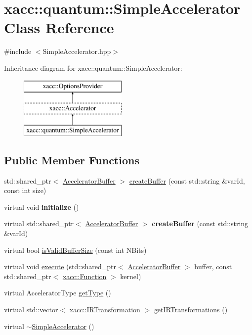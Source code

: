 \hypertarget{a01185}{}\section{xacc\+:\+:quantum\+:\+:Simple\+Accelerator Class Reference}
\label{a01185}


{\ttfamily \#include $<$Simple\+Accelerator.\+hpp$>$}

Inheritance diagram for xacc\+:\+:quantum\+:\+:Simple\+Accelerator\+:\begin{figure}[H]
\begin{center}
\leavevmode
\includegraphics[height=3.000000cm]{a01185}
\end{center}
\end{figure}
\subsection*{Public Member Functions}
\begin{DoxyCompactItemize}
\item 
std\+::shared\+\_\+ptr$<$ \hyperlink{a01625}{Accelerator\+Buffer} $>$ \hyperlink{a01185_adb9393692e9f484df241aa5d014030d1}{create\+Buffer} (const std\+::string \&var\+Id, const int size)
\item 
\mbox{\label{a01185_a392e3b30523f5f681127e7e98887108c}} 
virtual void {\bfseries initialize} ()
\item 
\mbox{\label{a01185_a46445d77d4b8ad2689571d0db6604380}} 
virtual std\+::shared\+\_\+ptr$<$ \hyperlink{a01625}{Accelerator\+Buffer} $>$ {\bfseries create\+Buffer} (const std\+::string \&var\+Id)
\item 
virtual bool \hyperlink{a01185_a60b9db2d6aed235857c45413a070338e}{is\+Valid\+Buffer\+Size} (const int N\+Bits)
\item 
virtual void \hyperlink{a01185_a3089b15fbbaa83abf2941bd3b8d2d3c6}{execute} (std\+::shared\+\_\+ptr$<$ \hyperlink{a01625}{Accelerator\+Buffer} $>$ buffer, const std\+::shared\+\_\+ptr$<$ \hyperlink{a01653}{xacc\+::\+Function} $>$ kernel)
\item 
virtual Accelerator\+Type \hyperlink{a01185_ad76eeb0bbd7de21aad5bd20d20970a98}{get\+Type} ()
\item 
virtual std\+::vector$<$ \hyperlink{a01681}{xacc\+::\+I\+R\+Transformation} $>$ \hyperlink{a01185_afc49c9e7973ba6c6ff9761c36198323d}{get\+I\+R\+Transformations} ()
\item 
virtual \hyperlink{a01185_a7ff286def924fafdff2066d12858e60c}{$\sim$\+Simple\+Accelerator} ()
\end{DoxyCompactItemize}
